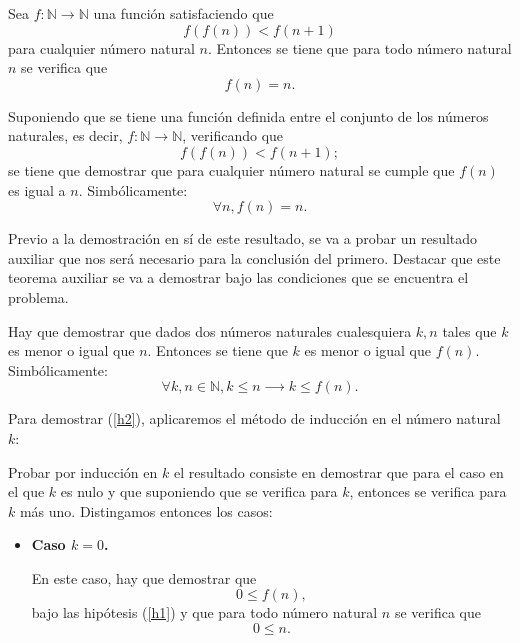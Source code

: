 \begin{teorema}[Extension]\label{extension}
  Sea \(f:ℕ → ℕ\) una función satisfaciendo que
  \begin{equation}
    f(f(n))<f(n+1)
  \end{equation}
  para cualquier número natural \(n\). Entonces se tiene que
  para todo número natural \(n\) se verifica que
  \begin{equation}
    f(n)=n.
  \end{equation}
\end{teorema}
\begin{demostracion}
  Suponiendo que se tiene una función definida entre el conjunto
  de los números naturales, es decir, \(f: ℕ → ℕ\), verificando
  que
  \begin{equation}\label{h1}\tag{h1}
     f(f(n))<f(n+1);
  \end{equation}
  se tiene que demostrar que para cualquier número natural se cumple
  que \(f(n)\) es igual a \(n\). Simbólicamente:
  \begin{equation}
    ∀ n, f(n)=n.
  \end{equation}

  Previo a la demostración en sí de este resultado, se va a probar
  un resultado auxiliar que nos será necesario para la conclusión
  del primero. Destacar que este teorema auxiliar se va a demostrar
  bajo las condiciones que se encuentra el problema.

  Hay que demostrar que dados dos números naturales cualesquiera
  \(k,n\) tales que \(k\) es menor o igual que \(n\). Entonces
  se tiene que \(k\) es menor o igual que \(f(n)\). Simbólicamente:
  \begin{equation}\label{h2}\tag{h2}
    ∀ k, n ∈ ℕ, k≤ n ⟶ k ≤ f(n).
  \end{equation}

  Para demostrar (\ref{h2}), aplicaremos el método de inducción
  en el número natural \(k\):

  Probar por inducción en \(k\) el resultado consiste en demostrar
  que para el caso en el que \(k\) es nulo y que suponiendo que se
  verifica para \(k\), entonces se verifica para \(k\) más uno.
  Distingamos entonces los casos:
  
  \begin{itemize}
    \item \textbf{Caso \(k=0\).}

      En este caso, hay que demostrar que
      \begin{equation}\label{dem}
        0≤f(n),
      \end{equation}
      bajo las hipótesis (\ref{h1}) y que para todo número natural
      \(n\) se verifica que
      \begin{equation}
        0≤ n. 
      \end{equation}


\end{itemize}
\end{demostracion}
